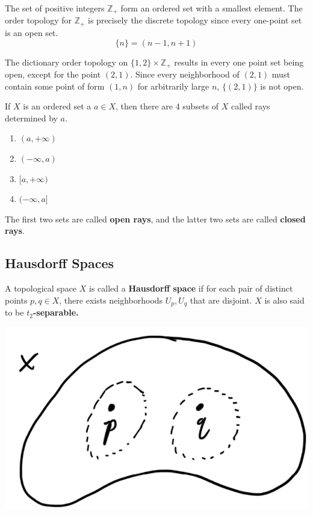 \documentclass{article}
\begin{document}
    \begin{example}
    The set of positive integers $\mathbb{Z}_+$ form an ordered set with a smallest element. The order topology for $\mathbb{Z}_+$ is precisely the discrete topology since every one-point set is an open set. 
    \[\{n\} = (n-1, n+1)\]
    \end{example}

    \begin{example}
    The dictionary order topology on $\{1, 2\} \times \mathbb{Z}_+$ results in every one point set being open, except for the point $(2, 1)$. Since every neighborhood of $(2,1)$ must contain some point of form $(1, n)$ for arbitrarily large $n$, $\{(2,1)\}$ is not open. 
    \end{example}

    \begin{definition}
    If $X$ is an ordered set a $a \in X$, then there are 4 subsets of $X$ called rays determined by $a$. 
    \begin{enumerate}
        \item $(a, +\infty)$ 
        \item $(-\infty, a)$
        \item $[a, +\infty)$
        \item $(-\infty, a]$
    \end{enumerate}
    The first two sets are called \textbf{open rays}, and the latter two sets are called \textbf{closed rays}. 
    \end{definition}

  \subsection{Hausdorff Spaces}

    \begin{definition}
    A topological space $X$ is called a \textbf{Hausdorff space} if for each pair of distinct points $p, q \in X$, there exists neighborhoods $U_p, U_q$ that are disjoint. $X$ is also said to be \textbf{$t_2$-separable.}
    \begin{center}
        \includegraphics[scale=0.35]{img/Hausdorff_Space_Separability.PNG}
    \end{center}
    \end{definition}
\end{document}
